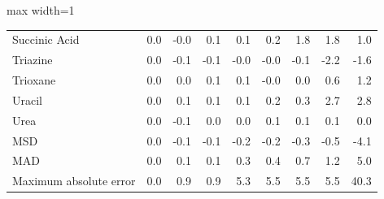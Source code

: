 \begin{table}[h]
\begin{adjustbox}{max width=1\textwidth}
\begin{tabular}{lrrrrrrrr}
Succinic Acid & 0.0 & -0.0 & 0.1 & 0.1 & 0.2 & 1.8 & 1.8 & 1.0 \\
Triazine & 0.0 & -0.1 & -0.1 & -0.0 & -0.0 & -0.1 & -2.2 & -1.6 \\
Trioxane & 0.0 & 0.0 & 0.1 & 0.1 & -0.0 & 0.0 & 0.6 & 1.2 \\
Uracil & 0.0 & 0.1 & 0.1 & 0.1 & 0.2 & 0.3 & 2.7 & 2.8 \\
Urea & 0.0 & -0.1 & 0.0 & 0.0 & 0.1 & 0.1 & 0.1 & 0.0 \\
MSD & 0.0 & -0.1 & -0.1 & -0.2 & -0.2 & -0.3 & -0.5 & -4.1 \\
MAD & 0.0 & 0.1 & 0.1 & 0.3 & 0.4 & 0.7 & 1.2 & 5.0 \\
Maximum absolute error & 0.0 & 0.9 & 0.9 & 5.3 & 5.5 & 5.5 & 5.5 & 40.3 \\
\bottomrule
\end{tabular}
\end{adjustbox}

\end{table}